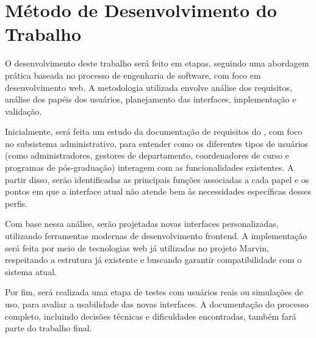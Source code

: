 


\section{Método de Desenvolvimento do Trabalho}
\label{sec-intro-met}


O desenvolvimento deste trabalho será feito em etapas, seguindo uma abordagem prática baseada no processo de engenharia de software, com foco em desenvolvimento web. A metodologia utilizada envolve análise dos requisitos, análise dos papéis dos usuários, planejamento das interfaces, implementação e validação.

Inicialmente, será feita um estudo da documentação de requisitos do \cite{requisitos_marvin_core}, com foco no subsistema administrativo, para entender como os diferentes tipos de usuários (como administradores, gestores de departamento, coordenadores de curso e programas de pós-graduação) interagem com as funcionalidades existentes. A partir disso, serão identificadas as principais funções associadas a cada papel e os pontos em que a interface atual não atende bem às necessidades específicas desses perfis.

Com base nessa análise, serão projetadas novas interfaces personalizadas, utilizando ferramentas modernas de desenvolvimento frontend. A implementação será feita por meio de tecnologias web já utilizadas no projeto Marvin, respeitando a estrutura já existente e buscando garantir compatibilidade com o sistema atual.

Por fim, será realizada uma etapa de testes com usuários reais ou simulações de uso, para avaliar a usabilidade das novas interfaces. A documentação do processo completo, incluindo decisões técnicas e dificuldades encontradas, também fará parte do trabalho final.

